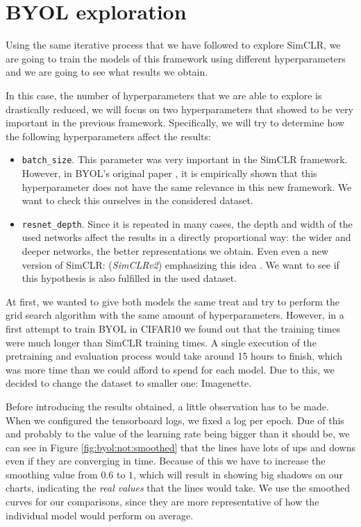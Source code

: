 \section{BYOL exploration}

Using the same iterative process that we have followed to explore SimCLR, we are going to train the models of this framework using different hyperparameters and we are going to see what results we obtain.

In this case, the number of hyperparameters that we are able to explore is drastically reduced, we will focus on two hyperparameters that showed to be very important in the previous framework. Specifically, we will try to determine how the following hyperparameters affect the results:

\begin{itemize}
\item \lstinline{batch_size}. This parameter was very important in the SimCLR framework. However, in BYOL's original paper \citep{grill2020bootstrap}, it is empirically shown that this hyperparameter does not have the same relevance in this new framework. We want to check this ourselves in the considered dataset.
\item \lstinline{resnet_depth}. Since it is repeated in many cases, the depth and width of the used networks affect the results in a directly proportional way: the wider and deeper networks, the better representations we obtain. Even even a new version of SimCLR: (\emph{SimCLRv2}) emphasizing this idea \citep{chen2020big}. We want to see if this hypothesis is also fulfilled in the used dataset.
\end{itemize}

At first, we wanted to give both models the same treat and try to perform the grid search algorithm with the same amount of hyperparameters. However, in a first attempt to train BYOL in CIFAR10 we found out that the training times were much longer than SimCLR training times. A single execution of the pretraining and evaluation process would take around 15 hours to finish, which was more time than we could afford to spend for each model. Due to this, we decided to change the dataset to smaller one: Imagenette. 

Before introducing the results obtained, a little observation has to be made. When we configured the tensorboard logs, we fixed a log per epoch. Due of this and probably to the value of the learning rate being bigger than it should be, we can see in Figure \ref{fig:byol:not:smoothed} that the lines have lots of ups and downs even if they are converging in time. Because of this we have to increase the smoothing value from $0.6$ to $1$, which will result in showing big shadows on our charts, indicating the \emph{real values} that the lines would take. We use the smoothed curves for our comparisons, since they are more representative of how the individual model would perform on average.


